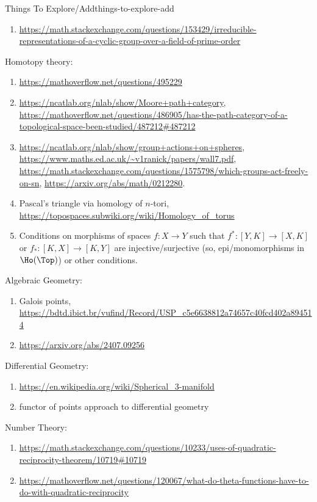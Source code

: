 \begin{remark}{Things To Explore/Add}{things-to-explore-add}
\begin{enumerate}
        \item \url{https://math.stackexchange.com/questions/153429/irreducible-representations-of-a-cyclic-group-over-a-field-of-prime-order}
    \end{enumerate}
    Homotopy theory:
    \begin{enumerate}
        \item \url{https://mathoverflow.net/questions/495229}
        \item \url{https://ncatlab.org/nlab/show/Moore+path+category}, \url{https://mathoverflow.net/questions/486905/has-the-path-category-of-a-topological-space-been-studied/487212#487212}
        \item \url{https://ncatlab.org/nlab/show/group+actions+on+spheres}, \url{https://www.maths.ed.ac.uk/~v1ranick/papers/wall7.pdf}, \url{https://math.stackexchange.com/questions/1575798/which-groups-act-freely-on-sn}, \url{https://arxiv.org/abs/math/0212280}.
        \item Pascal's triangle via homology of $n$-tori, \url{https://topospaces.subwiki.org/wiki/Homology_of_torus}
        \item Conditions on morphisms of spaces $f\colon X\to Y$ such that $f^{*}\colon[Y,K]\to[X,K]$ or $f_{*}\colon[K,X]\to[K,Y]$ are injective/surjective (so, epi/monomorphisms in $\Ho(\Top)$) or other conditions.
    \end{enumerate}
    Algebraic Geometry:
    \begin{enumerate}
        \item Galois points, \url{https://bdtd.ibict.br/vufind/Record/USP_c5e6638812a74657c40fcd402a894514}
        \item \url{https://arxiv.org/abs/2407.09256}
    \end{enumerate}
    Differential Geometry:
    \begin{enumerate}
        \item \url{https://en.wikipedia.org/wiki/Spherical\_3-manifold}
        \item functor of points approach to differential geometry
    \end{enumerate}
    Number Theory:
    \begin{enumerate}
        \item \url{https://math.stackexchange.com/questions/10233/uses-of-quadratic-reciprocity-theorem/10719#10719}
        \item \url{https://mathoverflow.net/questions/120067/what-do-theta-functions-have-to-do-with-quadratic-reciprocity}
    \end{enumerate}

\end{remark}
